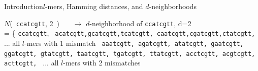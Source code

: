 \documentclass[pdf,xcolor={dvipsnames}]{beamer}
\begin{document}
\begin{frame}{Introduction}{$l$-mers, Hamming distances, and $d$-neighborhoods}
\begin{itemize}
{				{\footnotesize 
					$N$(\ \texttt{ccatcgtt}, 2\ )\ \ \ {\color{Gray} $\rightarrow$ $d$-neighborhood of \texttt{ccatcgtt}, d=2}\\
					\hspace*{0.055\textwidth}=  \{ \texttt{ccatcgtt}, \newline
					\texttt{
						\hspace*{0.1\textwidth}
						{\color{red}a}catcgtt,{\color{red}g}catcgtt,{\color{red}t}catcgtt,%
						c{\color{red}a}atcgtt,c{\color{red}g}atcgtt,c{\color{red}t}atcgtt,
					}	
					\hspace*{0.12\textwidth}...{\color{Gray} all $l$-mers with 1 mismatch}\newline
					\texttt{
						\hspace*{0.1\textwidth}
						{\color{red}a}{\color{red}a}atcgtt,%
						{\color{red}a}{\color{red}g}atcgtt,%
						{\color{red}a}{\color{red}t}atcgtt,%
						{\color{red}g}{\color{red}a}atcgtt,%
						{\color{red}g}{\color{red}g}atcgtt,%
						{\color{red}g}{\color{red}t}atcgtt,
						\hspace*{0.1\textwidth}
						{\color{red}t}{\color{red}a}atcgtt,%
						{\color{red}t}{\color{red}g}atcgtt,%
						{\color{red}t}{\color{red}t}atcgtt,%
						{\color{red}a}c{\color{red}c}tcgtt,%
						{\color{red}a}c{\color{red}g}tcgtt,%
						{\color{red}a}c{\color{red}t}tcgtt,					
				 	}
				 	\hspace*{0.12\textwidth}...{\color{Gray} all $l$-mers with 2 mismatches}\newline
				 	\hspace*{0.095\textwidth}{\footnotesize\}}
			 	}
			}
		\end{itemize}
		\end{frame}
\end{document}
